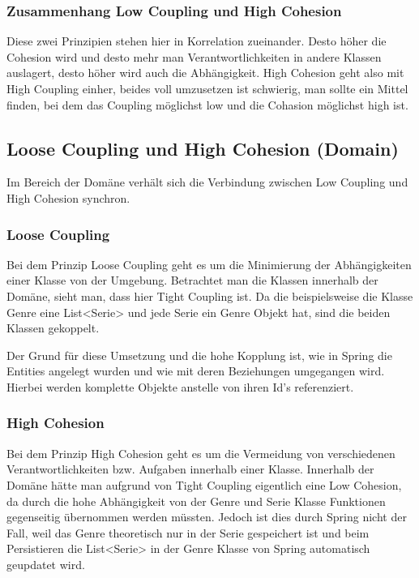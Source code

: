 		\subsubsection{Zusammenhang Low Coupling und High Cohesion}
		Diese zwei Prinzipien stehen hier in Korrelation zueinander. Desto höher die Cohesion wird und desto mehr man Verantwortlichkeiten in andere Klassen auslagert, desto höher wird auch die Abhängigkeit. High Cohesion geht also mit High Coupling einher, beides voll umzusetzen ist schwierig, man sollte ein Mittel finden, bei dem das Coupling möglichst low und die Cohasion möglichst high ist.
	
	\subsection{Loose Coupling und High Cohesion (Domain)}
	Im Bereich der Domäne verhält sich die Verbindung zwischen Low Coupling und High Cohesion synchron.
	
		\subsubsection{Loose Coupling}
		
		Bei dem Prinzip Loose Coupling geht es um die Minimierung der Abhängigkeiten einer Klasse von der Umgebung. Betrachtet man die Klassen innerhalb der Domäne, sieht man, dass hier Tight Coupling ist. Da die beispielsweise die Klasse Genre eine List<Serie> und jede Serie ein Genre Objekt hat, sind die beiden Klassen gekoppelt. 
		
		Der Grund für diese Umsetzung und die hohe Kopplung ist, wie in Spring die Entities angelegt wurden und wie mit deren Beziehungen umgegangen wird. Hierbei werden komplette Objekte anstelle von ihren Id's referenziert.
		
		\subsubsection{High Cohesion}
		
		Bei dem Prinzip High Cohesion geht es um die Vermeidung von verschiedenen Verantwortlichkeiten bzw. Aufgaben innerhalb einer Klasse. Innerhalb der Domäne hätte man aufgrund von Tight Coupling eigentlich eine Low Cohesion, da durch die hohe Abhängigkeit von der Genre und Serie Klasse Funktionen gegenseitig übernommen werden müssten. Jedoch ist dies durch Spring nicht der Fall, weil das Genre theoretisch nur in der Serie gespeichert ist und beim Persistieren die List<Serie> in der Genre Klasse von Spring automatisch geupdatet wird.
		
